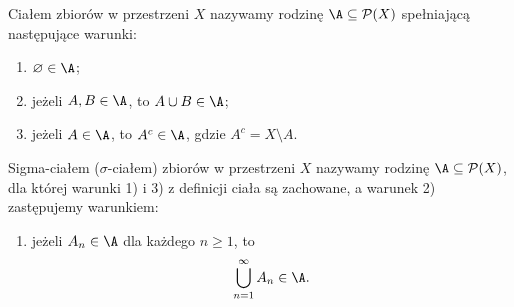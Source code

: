 \begin{definicja}
\label{def:cialo}
Ciałem zbiorów w przestrzeni $X$ nazywamy rodzinę $\A\subseteq\mathcal{P}(X)$
spełniającą następujące warunki:
\begin{enumerate}
  \item $\varnothing\in\A$;
  \item jeżeli $A,B\in\A$, to $A\cup B\in\A$;
  \item jeżeli $A\in\A$, to $A^c\in\A$, gdzie $A^c=X\setminus A$.
\end{enumerate}
\end{definicja}

\begin{definicja}
\label{def:sigma-cialo}
Sigma-ciałem (\mbox{$\sigma$-ciałem}) zbiorów w przestrzeni $X$ nazywamy
rodzinę $\A\subseteq\mathcal{P}(X)$, dla której warunki 1) i 3) z definicji
ciała są zachowane, a warunek 2) zastępujemy warunkiem:
\begin{enumerate}[label=2\textquotesingle),start=2]
  \item jeżeli $A_n\in\A$ dla każdego $n\geq1$, to
  \[
    \bigcup_{n=1}^{\infty}A_n\in\A.
  \]
\end{enumerate}
\end{definicja}
